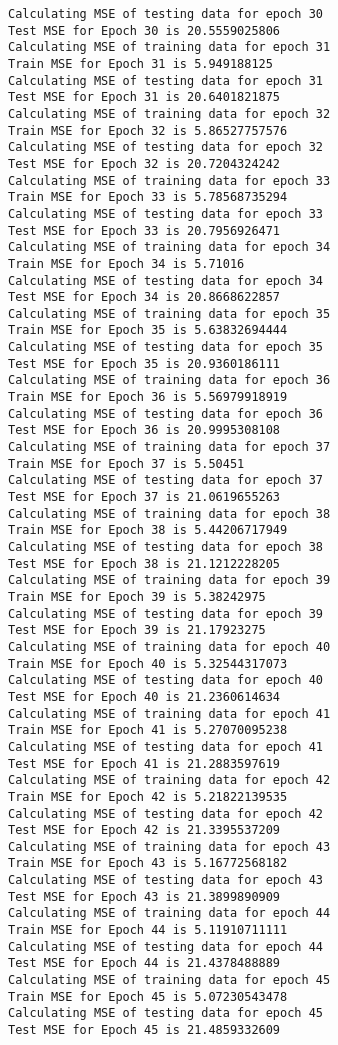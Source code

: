 \documentclass{article}
\begin{document}
\begin{Verbatim}[commandchars=\\\{\}]
Calculating MSE of testing data for epoch 30
Test MSE for Epoch 30 is 20.5559025806
Calculating MSE of training data for epoch 31
Train MSE for Epoch 31 is 5.949188125
Calculating MSE of testing data for epoch 31
Test MSE for Epoch 31 is 20.6401821875
Calculating MSE of training data for epoch 32
Train MSE for Epoch 32 is 5.86527757576
Calculating MSE of testing data for epoch 32
Test MSE for Epoch 32 is 20.7204324242
Calculating MSE of training data for epoch 33
Train MSE for Epoch 33 is 5.78568735294
Calculating MSE of testing data for epoch 33
Test MSE for Epoch 33 is 20.7956926471
Calculating MSE of training data for epoch 34
Train MSE for Epoch 34 is 5.71016
Calculating MSE of testing data for epoch 34
Test MSE for Epoch 34 is 20.8668622857
Calculating MSE of training data for epoch 35
Train MSE for Epoch 35 is 5.63832694444
Calculating MSE of testing data for epoch 35
Test MSE for Epoch 35 is 20.9360186111
Calculating MSE of training data for epoch 36
Train MSE for Epoch 36 is 5.56979918919
Calculating MSE of testing data for epoch 36
Test MSE for Epoch 36 is 20.9995308108
Calculating MSE of training data for epoch 37
Train MSE for Epoch 37 is 5.50451
Calculating MSE of testing data for epoch 37
Test MSE for Epoch 37 is 21.0619655263
Calculating MSE of training data for epoch 38
Train MSE for Epoch 38 is 5.44206717949
Calculating MSE of testing data for epoch 38
Test MSE for Epoch 38 is 21.1212228205
Calculating MSE of training data for epoch 39
Train MSE for Epoch 39 is 5.38242975
Calculating MSE of testing data for epoch 39
Test MSE for Epoch 39 is 21.17923275
Calculating MSE of training data for epoch 40
Train MSE for Epoch 40 is 5.32544317073
Calculating MSE of testing data for epoch 40
Test MSE for Epoch 40 is 21.2360614634
Calculating MSE of training data for epoch 41
Train MSE for Epoch 41 is 5.27070095238
Calculating MSE of testing data for epoch 41
Test MSE for Epoch 41 is 21.2883597619
Calculating MSE of training data for epoch 42
Train MSE for Epoch 42 is 5.21822139535
Calculating MSE of testing data for epoch 42
Test MSE for Epoch 42 is 21.3395537209
Calculating MSE of training data for epoch 43
Train MSE for Epoch 43 is 5.16772568182
Calculating MSE of testing data for epoch 43
Test MSE for Epoch 43 is 21.3899890909
Calculating MSE of training data for epoch 44
Train MSE for Epoch 44 is 5.11910711111
Calculating MSE of testing data for epoch 44
Test MSE for Epoch 44 is 21.4378488889
Calculating MSE of training data for epoch 45
Train MSE for Epoch 45 is 5.07230543478
Calculating MSE of testing data for epoch 45
Test MSE for Epoch 45 is 21.4859332609

\end{Verbatim}
\end{document}
